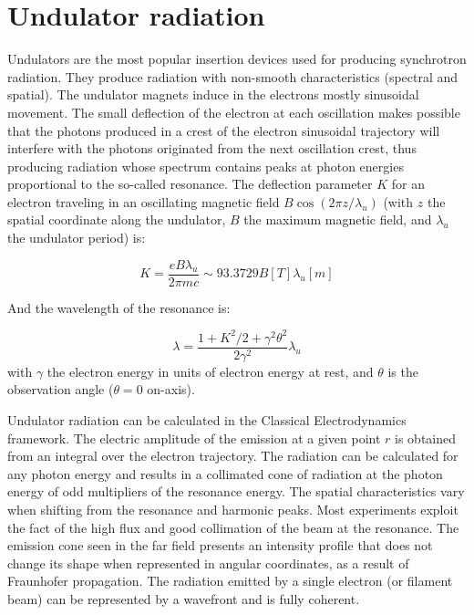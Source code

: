 \documentclass{iucr}              %
\begin{document}
\section{Undulator radiation}

Undulators are the most popular insertion devices used for producing synchrotron radiation. They produce radiation with non-smooth characteristics (spectral and spatial). The undulator magnets induce in the electrons mostly sinusoidal movement. The small deflection of the electron at each oscillation makes possible that the photons produced in a crest of the electron sinusoidal trajectory will interfere with the photons originated from the next oscillation crest, thus producing radiation whose spectrum contains peaks at photon energies proportional to the so-called resonance. The deflection parameter $K$ for an electron traveling in an oscillating magnetic field $B \cos(2 \pi z/\lambda_u)$ (with $z$ the spatial coordinate along the undulator, $B$ the maximum magnetic field, and $\lambda_u$ the undulator period) is:

\begin{equation}
K = \frac{e B \lambda_u}{2 \pi m c} \sim 93.3729 B[T] \lambda_u[m]
\label{K}
\end{equation}

And the wavelength of the resonance is:

\begin{equation}
\lambda = \frac{1+K^2/2+\gamma^2\theta^2}{2 \gamma^2} \lambda_u
\label{resonance}
\end{equation}
with $\gamma$ the electron energy in units of electron energy at rest, and $\theta$ is the observation angle ($\theta=0$ on-axis).

Undulator radiation can be calculated in the Classical Electrodynamics framework. The electric amplitude of the emission at a given point $r$ is obtained from an integral over the electron trajectory. The radiation can be calculated for any photon energy and results in a collimated cone of radiation at the photon energy of odd multipliers of the resonance energy. The spatial characteristics vary when shifting from the resonance and harmonic peaks. Most experiments exploit the fact of the high flux and good collimation of the beam at the resonance. The emission cone seen in the far field presents an intensity profile that does not change its shape when represented in angular coordinates, as a result of Fraunhofer propagation. The radiation emitted by a single electron (or filament beam) can be represented by a wavefront and is fully coherent. 
\end{document}
